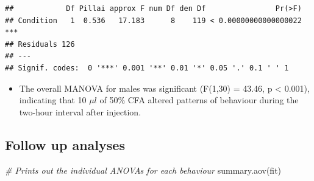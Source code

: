 \documentclass[
]{book}
\newenvironment{Shaded}{\begin{snugshade}}{\end{snugshade}}
\newcommand{\CommentTok}[1]{\textcolor[rgb]{0.56,0.35,0.01}{\textit{#1}}}
\newcommand{\FunctionTok}[1]{\textcolor[rgb]{0.00,0.00,0.00}{#1}}
\newcommand{\NormalTok}[1]{#1}
\providecommand{\tightlist}{%
  \setlength{\itemsep}{0pt}\setlength{\parskip}{0pt}}
\begin{document}
\begin{verbatim}
##            Df Pillai approx F num Df den Df                Pr(>F)    
## Condition   1  0.536   17.183      8    119 < 0.00000000000000022 ***
## Residuals 126                                                        
## ---
## Signif. codes:  0 '***' 0.001 '**' 0.01 '*' 0.05 '.' 0.1 ' ' 1
\end{verbatim}

\begin{itemize}
\tightlist
\item
  The overall MANOVA for males was significant (F(1,30) = 43.46, p \textless{} 0.001), indicating that 10 \(\mu l\) of 50\% CFA altered patterns of behaviour during the two-hour interval after injection.
\end{itemize}

\hypertarget{follow-up-analyses}{%
\subsection*{Follow up analyses}\label{follow-up-analyses}}

\begin{Shaded}
\begin{Highlighting}[]
\CommentTok{\# Prints out the individual ANOVAs for each behaviour}
\FunctionTok{summary.aov}\NormalTok{(fit)}
\end{Highlighting}
\end{Shaded}
\end{document}
